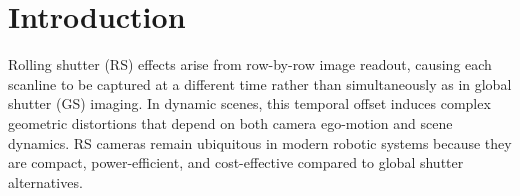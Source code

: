 

\section{Introduction}

Rolling shutter (RS) effects arise from row-by-row image readout, causing each scanline to be captured at a different time rather than simultaneously as in global shutter (GS) imaging. In dynamic scenes, this temporal offset induces complex geometric distortions that depend on both camera ego-motion and scene dynamics. RS cameras remain ubiquitous in modern robotic systems because they are compact, power-efficient, and cost-effective compared to global shutter alternatives\cite{4549748}. 

